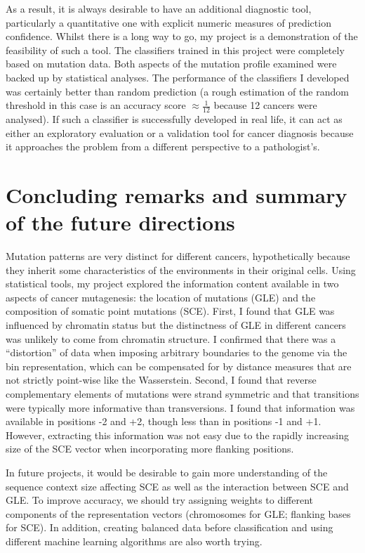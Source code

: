As a result, it is always desirable to have an additional diagnostic tool, particularly a quantitative one with explicit numeric measures of prediction confidence. Whilst there is a long way to go, my project is a demonstration of the feasibility of such a tool. The classifiers trained in this project were completely based on mutation data. Both aspects of the mutation profile examined were backed up by statistical analyses. The performance of the classifiers I developed was certainly better than random prediction (a rough estimation of the random threshold in this case is an accuracy score $\approx \frac{1}{12}$ because 12 cancers were analysed). If such a classifier is successfully developed in real life, it can act as either an exploratory evaluation or a validation tool for cancer diagnosis because it approaches the problem from a different perspective to a pathologist's. 

\section{Concluding remarks and summary of the future directions}\label{discussion:conclusion}
Mutation patterns are very distinct for different cancers, hypothetically because they inherit some characteristics of the environments in their original cells. Using statistical tools, my project explored the information content available in two aspects of cancer mutagenesis: the location of mutations (GLE) and the composition of somatic point mutations (SCE). First, I found that GLE was influenced by chromatin status but the distinctness of GLE in different cancers was unlikely to come from chromatin structure. I confirmed that there was a ``distortion'' of data when imposing arbitrary boundaries to the genome via the bin representation, which can be compensated for by distance measures that are not strictly point-wise like the Wasserstein. Second, I found that reverse complementary elements of mutations were strand symmetric and that transitions were typically more informative than transversions. I found that information was available in positions -2 and +2, though less than in positions -1 and +1. However, extracting this information was not easy due to the rapidly increasing size of the SCE vector when incorporating more flanking positions.

In future projects, it would be desirable to gain more understanding of the sequence context size affecting SCE as well as the interaction between SCE and GLE. To improve accuracy, we should try assigning weights to different components of the representation vectors (chromosomes for GLE; flanking bases for SCE). In addition, creating balanced data before classification and using different machine learning algorithms are also worth trying.